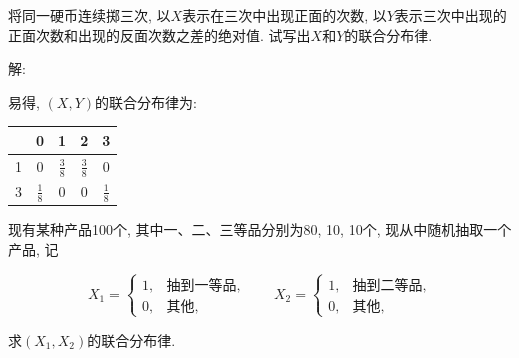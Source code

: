 \documentclass[standard]{ExBook}
\begin{document}
\begin{qitems}
\vspace{-5em}

    \begin{bbox}
    \begin{shaded}
        \qitem
将同一硬币连续掷三次, 以$X$表示在三次中出现正面的次数, 以$Y$表示三次中出现的正面次数和出现的反面次数之差的绝对值. 试写出$X$和$Y$的联合分布律.
    \end{shaded}
    \end{bbox}

\vspace{-5em}

    \begin{bbox}
解: 

易得, $(X,Y)$的联合分布律为:
\begin{footnotesize}
\begin{center}
    \renewcommand{\arraystretch}{1.5}
    \setlength{\tabcolsep}{20pt}
    \begin{tabular}{c|c|c|c|c}
	    \hline
	    \diagbox{$Y$}{$P(X,Y)$}{$X$} & 0 & 1 & 2 & 3 \\
	    \hline
	    1 & 0 & $\displaystyle\frac{3}{8}$ & $\displaystyle\frac{3}{8}$ & 0 \\
	    \hline
	    3 & $\displaystyle\frac{1}{8}$ & 0 & 0 & $\displaystyle\frac{1}{8}$\\
	    \hline
    \end{tabular}
\end{center}
\end{footnotesize}
    \end{bbox}

\vspace{-5em}

    \begin{bbox}
    \begin{shaded}
        \qitem
现有某种产品100个, 其中一、二、三等品分别为80, 10, 10个, 现从中随机抽取一个产品, 记
\vspace{-2em}
\begin{center}
\begin{equation}
    X_1=
    \left\{
    \begin{array}{cl}
        \nonumber
        1, &\text{抽到一等品},\\
        0, &\text{其他},
    \end{array}
    \right.
    \qquad
    X_2=
    \left\{
    \begin{array}{cl}
        \nonumber
        1, &\text{抽到二等品},\\
        0, &\text{其他},
    \end{array}
    \right.
\end{equation}
\end{center}
求$(X_1,X_2)$的联合分布律.
    \end{shaded}
    \end{bbox}


\end{qitems}
\end{document}
